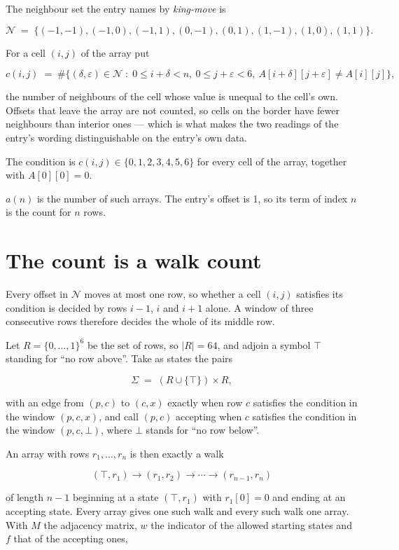 \documentclass[11pt]{article}
\theoremstyle{definition}
\begin{document}
The neighbour set the entry names by {\itshape king-move} is

\[\mathcal{N} \;=\; \{(-1,-1), (-1,0), (-1,1), (0,-1), (0,1), (1,-1), (1,0), (1,1)\}.\]

For a cell $(i,j)$ of the array put

\[c(i,j) \;=\; \#\bigl\{(\delta,\varepsilon)\in\mathcal{N} \;:\; 0\le i+\delta<n,\ 0\le j+\varepsilon<6,\ A[i+\delta][j+\varepsilon] \neq A[i][j]\bigr\},\]

the number of neighbours of the cell whose value is unequal to the cell's own. Offsets that leave the array are not counted, so cells on the border have fewer neighbours than interior ones --- which is what makes the two readings of the entry's wording distinguishable on the entry's own data.

The condition is $c(i,j) \in \{0, 1, 2, 3, 4, 5, 6\}$ for every cell of the array, together with $A[0][0]=0$.

$a(n)$ is the number of such arrays. The entry's offset is 1, so its term of index $n$ is the count for $n$ rows.

\section{The count is a walk count}

Every offset in $\mathcal{N}$ moves at most one row, so whether a cell $(i,j)$ satisfies its condition is decided by rows $i-1$, $i$ and $i+1$ alone. A window of three consecutive rows therefore decides the whole of its middle row.

Let $R = \{0,\dots,1\}^{6}$ be the set of rows, so $|R| = 64$, and adjoin a symbol $\top$ standing for ``no row above''. Take as states the pairs

\[\Sigma \;=\; (R \cup \{\top\}) \times R,\]

with an edge from $(p,c)$ to $(c,x)$ exactly when row $c$ satisfies the condition in the window $(p,c,x)$, and call $(p,c)$ accepting when $c$ satisfies the condition in the window $(p,c,\bot)$, where $\bot$ stands for ``no row below''.

An array with rows $r_1,\dots,r_n$ is then exactly a walk

\[(\top,r_1) \to (r_1,r_2) \to \cdots \to (r_{n-1},r_n)\]

of length $n-1$ beginning at a state $(\top,r_1)$ with $r_1[0]=0$ and ending at an accepting state. Every array gives one such walk and every such walk one array. With $M$ the adjacency matrix, $w$ the indicator of the allowed starting states and $f$ that of the accepting ones,
\end{document}
